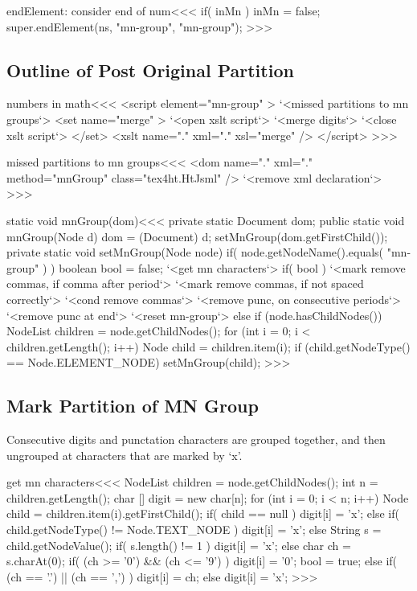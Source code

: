 \documentclass{article}
\begin{document}
\<endElement: consider end of num\><<<
if( inMn ){
   inMn = false;
   super.endElement(ns, "mn-group", "mn-group"); 
}
>>>

\subsection{Outline of Post Original Partition}


\<numbers in math\><<<
<script element="mn-group" >
   `<missed partitions to mn groups`>
   <set name="merge" >
      `<open xslt script`>
      `<merge digits`>
      `<close xslt script`>
   </set>
   <xslt name="." xml="." xsl="merge" />
</script> 
>>>



\<missed partitions to mn groups\><<<
<dom name="." xml="." method="mnGroup" class="tex4ht.HtJsml" />
`<remove xml declaration`>
>>>


\<static void mnGroup(dom)\><<<
private static Document dom;
public static void mnGroup(Node d) {
  dom = (Document) d;
  setMnGroup(dom.getFirstChild());
}
private static void setMnGroup(Node node) {
  if( node.getNodeName().equals( "mn-group" ) ){
         boolean bool = false;
    `<get mn characters`>
    if( bool ){
      `<mark remove commas, if comma after period`>
      `<mark remove commas, if not spaced correctly`>
      `<cond remove commas`>
      `<remove punc, on consecutive periods`>
      `<remove punc at end`>
    }
    `<reset mn-group`>
  } else if (node.hasChildNodes()) {
     NodeList children = node.getChildNodes();
     for (int i = 0; i < children.getLength(); i++) {
        Node child = children.item(i);
        if (child.getNodeType() == Node.ELEMENT_NODE) {
           setMnGroup(child);
} }  }  }
>>>

\subsection{Mark Partition of MN Group}

Consecutive digits and punctation characters are grouped together, and
then ungrouped at characters that are marked by `x'.   


\<get mn characters\><<<
NodeList children = node.getChildNodes();
int n = children.getLength();
char [] digit = new char[n];
for (int i = 0; i < n; i++) {
  Node child = children.item(i).getFirstChild();
  if( child == null ){ 
     digit[i] = 'x';
  } else if( child.getNodeType() != Node.TEXT_NODE ){
     digit[i] = 'x';
  } else {
     String s = child.getNodeValue();
     if( s.length() != 1 ){ 
       digit[i] = 'x';
     } else {
       char ch = s.charAt(0);
       if(      (ch >= '0') && (ch <= '9') ){
          digit[i] = '0'; bool = true;
       } else if( (ch == '.') || (ch == ',') ){ digit[i] = ch; }
       else                                 { digit[i] = 'x';}
} }  }
>>>
\end{document}

